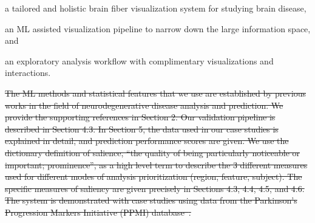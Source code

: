 \begin{compactitem}
	\item a tailored and holistic brain fiber visualization system for studying brain disease,
	\item an ML assisted visualization pipeline to narrow down the large information space, and
	\item an exploratory analysis workflow with complimentary visualizations and interactions.
\end{compactitem}

\color{black}
\sout{
The ML methods and statistical features that we use are established by previous works in the field of neurodegenerative disease analysis and prediction. We provide the supporting references in Section 2. Our validation pipeline is described in Section 4.3. In Section 5, the data used in our case studies is explained in detail, and prediction performance scores are given. We use the dictionary definition of salience, “the quality of being particularly noticeable or important; prominence”, as a high level term to describe the 3 different measures used for different modes of analysis prioritization (region, feature, subject). The specific measures of saliency are given precisely in Sections 4.3, 4.4, 4.5, and 4.6. The system is demonstrated with case studies using data from 
the Parkinson's Progression Markers Initiative (PPMI) database~\cite{marek2011parkinson}. 
}


